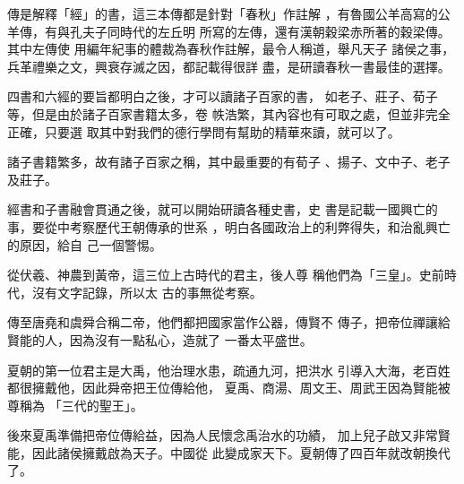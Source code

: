 \documentclass[avery5371,grid]{flashcards}
\begin{document}
{傳是解釋「經」的書，這三本傳都是針對「春秋」作註解
，有魯國公羊高寫的公羊傳，有與孔夫子同時代的左丘明
所寫的左傳，還有漢朝穀梁赤所著的穀梁傳。其中左傳使
用編年紀事的體裁為春秋作註解，最令人稱道，舉凡天子
諸侯之事，兵革禮樂之文，興衰存滅之因，都記載得很詳
盡，是研讀春秋一書最佳的選擇。} %
{} %







{四書和六經的要旨都明白之後，才可以讀諸子百家的書，
如老子、莊子、荀子等，但是由於諸子百家書籍太多，卷
帙浩繁，其內容也有可取之處，但並非完全正確，只要選
取其中對我們的德行學問有幫助的精華來讀，就可以了。} %
{} %

{諸子書籍繁多，故有諸子百家之稱，其中最重要的有荀子
、揚子、文中子、老子及莊子。} %
{} %

{經書和子書融會貫通之後，就可以開始研讀各種史書，史
書是記載一國興亡的事，要從中考察歷代王朝傳承的世系
，明白各國政治上的利弊得失，和治亂興亡的原因，給自
己一個警惕。} %
{} %

{從伏羲、神農到黃帝，這三位上古時代的君主，後人尊
稱他們為「三皇」。史前時代，沒有文字記錄，所以太
古的事無從考察。} %
{} %

{傳至唐堯和虞舜合稱二帝，他們都把國家當作公器，傳賢不
傳子，把帝位禪讓給賢能的人，因為沒有一點私心，造就了
一番太平盛世。} %
{} %

{夏朝的第一位君主是大禹，他治理水患，疏通九河，把洪水
引導入大海，老百姓都很擁戴他，因此舜帝把王位傳給他，
夏禹、商湯、周文王、周武王因為賢能被尊稱為
「三代的聖王」。} %
{} %







{後來夏禹準備把帝位傳給益，因為人民懷念禹治水的功績，
加上兒子啟又非常賢能，因此諸侯擁戴啟為天子。中國從
此變成家天下。夏朝傳了四百年就改朝換代了。} %
{} %
\end{document}
